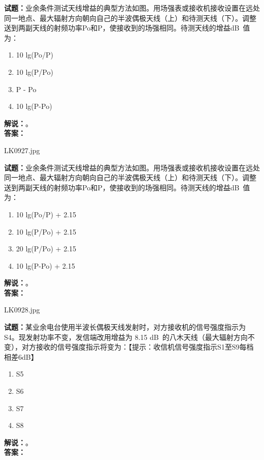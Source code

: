 \documentclass{ctexbook}
\begin{document}
\vspace{\baselineskip}

\noindent\textbf{试题：}业余条件测试天线增益的典型方法如图。用场强表或接收机接收设置在远处同一地点、最大辐射方向朝向自己的半波偶极天线（上）和待测天线（下）。调整送到两副天线的射频功率Po和P，使接收到的场强相同。待测天线的增益\unit[qualifier-mode=combine]{\deci\bel{}}值为：
\begin{enumerate}[leftmargin=3em]
  \item 10 lg(Po/P)
  \item 10 lg(P/Po)
  \item P - Po
  \item 10 lg(P-Po)
\end{enumerate}
\noindent\textbf{解说：}\textbf{}。\\\noindent\textbf{答案：}

\vspace{\baselineskip}

LK0927.jpg

\noindent\textbf{试题：}业余条件测试天线增益的典型方法如图。用场强表或接收机接收设置在远处同一地点、最大辐射方向朝向自己的半波偶极天线（上）和待测天线（下）。调整送到两副天线的射频功率Po和P，使接收到的场强相同。待测天线的增益\unit[qualifier-mode=combine]{\deci\bel{}}值为：
\begin{enumerate}[leftmargin=3em]
  \item 10 lg(Po/P) + 2.15
  \item 10 lg(P/Po) + 2.15
  \item 20 lg(P/Po) + 2.15
  \item 10 lg(P-Po) + 2.15
\end{enumerate}
\noindent\textbf{解说：}\textbf{}。\\\noindent\textbf{答案：}

\vspace{\baselineskip}

LK0928.jpg

\noindent\textbf{试题：}某业余电台使用半波长偶极天线发射时，对方接收机的信号强度指示为S4。现发射功率不变，发信端改用增益为 8.15 \unit[qualifier-mode=combine]{\deci\bel{}}的八木天线（最大辐射方向不变），对方接收的信号强度指示将变为：【提示：收信机信号强度指示S1至S9每档相差6dB】
\begin{enumerate}[leftmargin=3em]
  \item S5
  \item S6
  \item S7
  \item S8
\end{enumerate}
\noindent\textbf{解说：}\textbf{}。\\\noindent\textbf{答案：}
\end{document}
